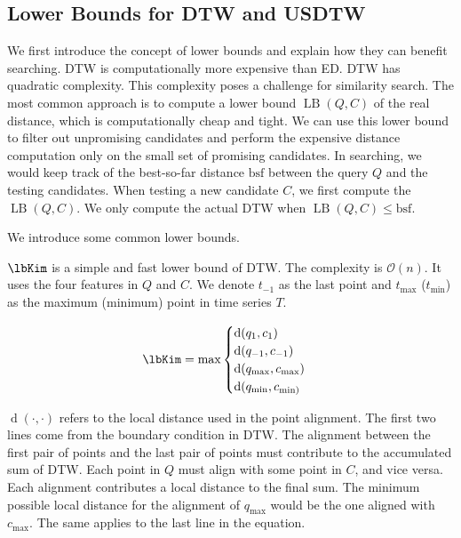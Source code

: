 \subsection{Lower Bounds for DTW and USDTW}

We first introduce the concept of lower bounds and explain how they can benefit searching.
%
DTW is computationally more expensive than ED.
DTW has quadratic complexity.
This complexity poses a challenge for similarity search.
The most common approach is to compute a lower bound $\operatorname{LB}(Q, C)$ of the real distance, which is computationally cheap and tight.
We can use this lower bound to filter out unpromising candidates and perform the expensive distance computation only on the small set of promising candidates.
In searching, we would keep track of the best-so-far distance $\mathrm{bsf}$ between the query $Q$ and the testing candidates.
When testing a new candidate $C$, we first compute the $\operatorname{LB}(Q, C)$. We only compute the actual DTW when $\operatorname{LB}(Q, C) \leq \mathrm{bsf}$.

We introduce some common lower bounds.

\noindent{} $\lbKim$ is a simple and fast lower bound of DTW.
The complexity is $\mathcal{O}(n)$.
It uses the four features in $Q$ and $C$.
We denote $t_{-1}$ as the last point and $t_{\max}$ ($t_{\min}$) as the maximum (minimum) point in time series $T$.

\begin{equation} 
    \label{eq:lb-kim}
    \lbKim= \max
        \begin{cases}
            \operatorname{d}(q_1, c_1)\\
            \operatorname{d}(q_{-1}, c_{-1})\\
            \operatorname{d}(q_{\max}, c_{\max})\\
            \operatorname{d}(q_{\min}, c_{\min)}\\
        \end{cases}
\end{equation}

$\operatorname{d}(\cdot, \cdot)$ refers to the local distance used in the point alignment.
The first two lines come from the boundary condition in DTW.
The alignment between the first pair of points and the last pair of points must contribute to the accumulated sum of DTW.
Each point in $Q$ must align with some point in $C$, and vice versa. Each alignment contributes a local distance to the final sum.
The minimum possible local distance for the alignment of $q_{\max}$ would be the one aligned with $c_{\max}$.
The same applies to the last line in the equation.

